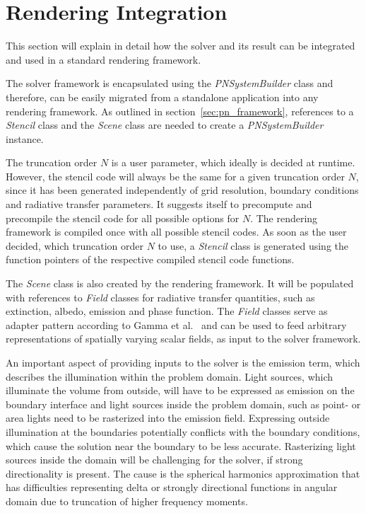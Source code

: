 \section{Rendering Integration}
\label{sec:pn_rendering_integration}

This section will explain in detail how the solver and its result can be integrated and used in a standard rendering framework.

The solver framework is encapsulated using the \emph{PNSystemBuilder} class and therefore, can be easily migrated from a standalone application into any rendering framework. As outlined in section~\ref{sec:pn_framework}, references to a \emph{Stencil} class and the \emph{Scene} class are needed to create a \emph{PNSystemBuilder} instance.

The truncation order $N$ is a user parameter, which ideally is decided at runtime. However, the stencil code will always be the same for a given truncation order $N$, since it has been generated independently of grid resolution, boundary conditions and radiative transfer parameters. It suggests itself to precompute and precompile the stencil code for all possible options for $N$. The rendering framework is compiled once with all possible stencil codes. As soon as the user decided, which truncation order $N$ to use, a \emph{Stencil} class is generated using the function pointers of the respective compiled stencil code functions.

The \emph{Scene} class is also created by the rendering framework. It will be populated with references to \emph{Field} classes for radiative transfer quantities, such as extinction, albedo, emission and phase function. The \emph{Field} classes serve as adapter pattern according to Gamma et al.~\cite{Gamma95} and can be used to feed arbitrary representations of spatially varying scalar fields, as input to the solver framework.

An important aspect of providing inputs to the solver is the emission term, which describes the illumination within the problem domain. Light sources, which illuminate the volume from outside, will have to be expressed as emission on the boundary interface and light sources inside the problem domain, such as point- or area lights need to be rasterized into the emission field. Expressing outside illumination at the boundaries potentially conflicts with the boundary conditions, which cause the solution near the boundary to be less accurate. Rasterizing light sources inside the domain will be challenging for the solver, if strong directionality is present. The cause is the spherical harmonics approximation that has difficulties representing delta or strongly directional functions in angular domain due to truncation of higher frequency moments.

